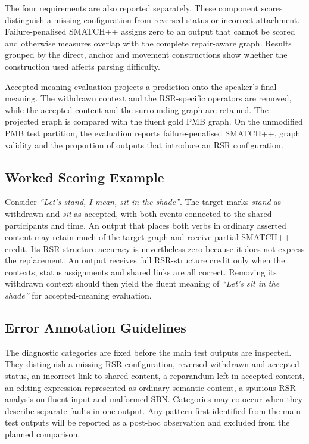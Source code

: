 \documentclass{article}
\begin{document}
The four requirements are also reported separately. These component scores
distinguish a missing configuration from reversed status or incorrect
attachment. Failure-penalised SMATCH++ assigns zero to an output that cannot be
scored and otherwise measures overlap with the complete repair-aware graph.
Results grouped by the direct, anchor and movement constructions show whether
the construction used affects parsing difficulty.

Accepted-meaning evaluation projects a prediction onto the speaker's final
meaning. The withdrawn context and the RSR-specific operators are removed, while
the accepted content and the surrounding graph are retained. The projected
graph is compared with the fluent gold PMB graph. On the unmodified PMB
test partition, the evaluation reports failure-penalised SMATCH++, graph
validity and the proportion of outputs that introduce an RSR configuration.

\subsection{Worked Scoring Example}
\label{app:model-scoring}

Consider \textit{``Let's stand, I mean, sit in the shade''}. The target marks
\textit{stand} as withdrawn and \textit{sit} as accepted, with both events
connected to the shared participants and time. An output that places both
verbs in ordinary asserted content may retain much of the target graph and
receive partial SMATCH++ credit. Its RSR-structure accuracy is nevertheless
zero because it does not express the replacement. An output receives full
RSR-structure credit only when the contexts, status assignments and shared
links are all correct. Removing its withdrawn context should then yield the
fluent meaning of \textit{``Let's sit in the shade''} for accepted-meaning
evaluation.

\subsection{Error Annotation Guidelines}
\label{app:model-errors}

The diagnostic categories are fixed before the main test outputs are
inspected. They distinguish a missing RSR configuration, reversed
withdrawn and accepted status, an incorrect link to shared content, a
reparandum left in accepted content, an editing expression represented as ordinary
semantic content, a spurious RSR analysis on fluent input and malformed SBN. Categories
may co-occur when they describe separate faults in one output. Any pattern
first identified from the main test outputs will be reported as a post-hoc
observation and excluded from the planned comparison.
\end{document}
